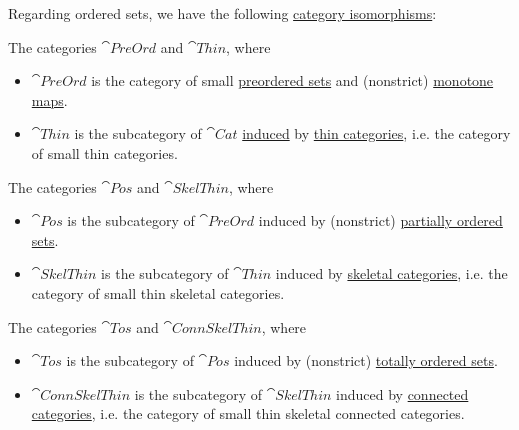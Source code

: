 \begin{theorem}\label{thm:order_category_isomorphism}
  Regarding ordered sets, we have the following \hyperref[rem:category_similarity/isomorphism]{category isomorphisms}:
  \begin{thmenum}
     The categories \hyperref[def:preordered_set/category]{\( \cat{PreOrd} \)} and \( \cat{Thin} \), where
    \begin{itemize}
      \item \( \cat{PreOrd} \) is the category of small \hyperref[def:preordered_set]{preordered sets} and (nonstrict) \hyperref[def:preordered_set/homomorphism]{monotone maps}.

      \item \( \cat{Thin} \) is the subcategory of \hyperref[def:category_of_small_categories]{\( \cat{Cat} \)} \hyperref[def:subcategory]{induced} by \hyperref[def:thin_category]{thin categories}, i.e. the category of small thin categories.
    \end{itemize}

     The categories \hyperref[def:partially_ordered_set/category]{\( \cat{Pos} \)} and \( \cat{SkelThin} \), where
    \begin{itemize}
      \item \( \cat{Pos} \) is the subcategory of \( \cat{PreOrd} \) induced by (nonstrict) \hyperref[def:partially_ordered_set]{partially ordered sets}.

      \item \( \cat{SkelThin} \) is the subcategory of \( \cat{Thin} \) induced by \hyperref[def:skeletal_category]{skeletal categories}, i.e. the category of small thin skeletal categories.
    \end{itemize}

     The categories \hyperref[def:totally_ordered_set]{\( \cat{Tos} \)} and \( \cat{ConnSkelThin} \), where
    \begin{itemize}
      \item \( \cat{Tos} \) is the subcategory of \( \cat{Pos} \) induced by (nonstrict) \hyperref[def:totally_ordered_set]{totally ordered sets}.

      \item \( \cat{ConnSkelThin} \) is the subcategory of \( \cat{SkelThin} \) induced by \hyperref[def:connected_category]{connected categories}, i.e. the category of small thin skeletal connected categories.
    \end{itemize}
  \end{thmenum}
\end{theorem}
